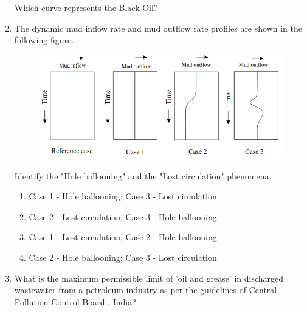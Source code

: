 \documentclass[journal,12pt,onecolumn]{IEEEtran}
\theoremstyle{remark}
\begin{document}
\begin{enumerate}
Which curve represents the Black Oil?

\hfill{}

\begin{enumerate}
\end{enumerate}

\item The dynamic mud inflow rate and mud outflow rate profiles are shown in the
following figure.

\begin{figure}[h!]
  \centering
  \includegraphics[width=0.8\columnwidth]{figs/fig7.png} 
   \caption*{}
  \label{fig:Q20}
\end{figure}

Identify the "Hole ballooning" and the "Lost circulation" phenomena.

\hfill{}

\begin{enumerate}
\item Case 1 - Hole ballooning; Case 3 - Lost circulation
\item Case 2 - Lost circulation; Case 3 - Hole ballooning
\item Case 1 - Lost circulation; Case 2 - Hole ballooning
\item Case 2 - Hole ballooning; Case 3 - Lost circulation
\end{enumerate}

\item What is the maximum permissible limit of 'oil and grease' in discharged wastewater from a petroleum industry as per the guidelines of Central Pollution Control Board , India?

\hfill{}


\end{enumerate}
\end{document}
